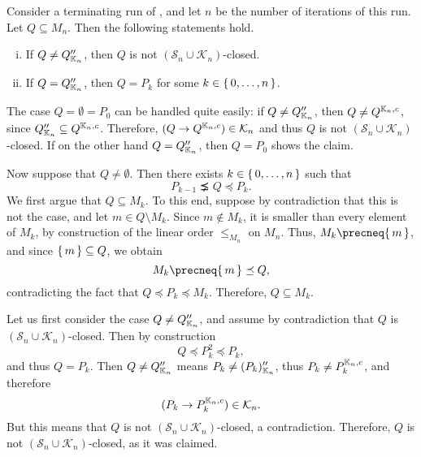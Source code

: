 \begin{Proposition}
  \label{prop:property-of-confident-bases-with-growing-sets-of-attributes}
  Consider a terminating run of , and let $n$
  be the number of iterations of this run.  Let $Q \subseteq M_{n}$.   Then the following
  statements hold.
  \begin{enumerate}[i. ]
  \item If $Q \neq Q_{{\mathbb{K}}_{n}}''$, then $Q$ is not $(\mathcal{S}_{n} \cup
    \mathcal{K}_{n})$-closed.
  \item If $Q = Q_{{\mathbb{K}}_{n}}''$, then $Q = P_{k}$ for some $k \in {\ensuremath{\{\, 0, \dots, n \,\}}}$.
  \end{enumerate}
\end{Proposition}
\begin{Proof}
  The case $Q = \emptyset = P_{0}$ can be handled quite easily: if $Q \neq Q_{{\mathbb{K}}_{n}}''$, then $Q \neq Q^{{\mathbb{K}}_{n}, c}$, since $Q_{{\mathbb{K}}_{n}}'' \subseteq Q^{{\mathbb{K}}_{n}, c}$.  Therefore, $(Q \to Q^{{\mathbb{K}}_{n}, c}) \in \mathcal{K}_{n}$ and thus $Q$
  is not $(\mathcal{S}_{n} \cup \mathcal{K}_{n})$-closed.  If on the other hand $Q =
  Q_{{\mathbb{K}}_{n}}''$, then $Q = P_{0}$ shows the claim.

  Now suppose that $Q \neq \emptyset$.  Then there exists $k \in {\ensuremath{\{\,0, \dots, n\,\}}}$ such that
  \begin{equation*}
    P_{k-1} \precneq Q \preceq P_{k}.
  \end{equation*}
  We first argue that $Q \subseteq M_{k}$.  To this end, suppose by contradiction that
  this is not the case, and let $m \in Q \setminus M_{k}$.  Since $m \notin M_{k}$, it is
  smaller than every element of $M_{k}$, by construction of the linear order
  $\leq_{M_{n}}$ on $M_{n}$.  Thus, $M_{k} \precneq \set{m}$, and since ${\{\,m\,\}} \subseteq
  Q$, we obtain
  \begin{equation*}
    M_{k} \precneq \set{m} \preceq Q,
  \end{equation*}
  contradicting the fact that $Q \preceq P_{k} \preceq M_{k}$.  Therefore, $Q \subseteq
  M_{k}$.

  Let us first consider the case $Q \neq Q_{{\mathbb{K}}_{n}}''$, and assume by contradiction
  that $Q$ is $(\mathcal{S}_{n} \cup \mathcal{K}_{n})$-closed.  Then by construction
  \begin{equation*}
    Q \preceq P_{k}^{2} \preceq P_{k},
  \end{equation*}
  and thus $Q = P_{k}$.  Then $Q \neq Q_{{\mathbb{K}}_{n}}''$ means $P_{k} \neq (P_{k})_{{\mathbb{K}}_{n}}''$, thus $P_{k} \neq P_{k}^{{\mathbb{K}}_{n}, c}$, and therefore
  \begin{equation*}
    (P_{k} \to P_{k}^{{\mathbb{K}}_{n}, c}) \in \mathcal{K}_{n}.
  \end{equation*}
  But this means that $Q$ is not $(\mathcal{S}_{n} \cup \mathcal{K}_{n})$-closed, a
  contradiction.  Therefore, $Q$ is not $(\mathcal{S}_{n} \cup \mathcal{K}_{n})$-closed,
  as it was claimed.


\end{Proof}
